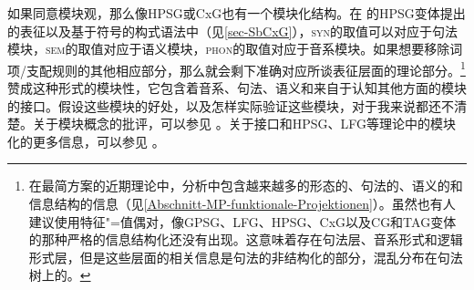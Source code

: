\noindent
如果同意模块观，那么像HPSG或CxG也有一个模块化结构。在 \citet{ps}的HPSG变体提出的表征以及基于符号的构式语法中（见\ref{sec-SbCxG}），\textsc{syn}的取值可以对应于句法模块，\textsc{sem}的取值对应于语义模块，\textsc{phon}的取值对应于音系模块。如果想要移除词项/支配规则的其他相应部分，那么就会剩下准确对应所谈表征层面的理论部分。\footnote{%
在最简方案的近期理论中，分析中包含越来越多的形态的、句法的、语义的和信息结构的信息（见\ref{Abschnitt-MP-funktionale-Projektionen}）。虽然也有人建议使用特征"=值偶对\citep[--291]{SE2002a}，像GPSG\indexgpsgc、LFG\indexlfgc、HPSG\indexhpsgc、CxG\indexcxgc 以及CG\indexcgc 和TAG\indextagc 变体的那种严格的信息结构化还没有出现。这意味着存在句法层、音系形式和逻辑形式层，但是这些层面的相关信息是句法的非结构化的部分，混乱分布在句法树上的。  
} 赞成这种形式的模块性，它包含着音系、句法、语义和来自于认知其他方面的模块的接口。假设这些模块的好处，以及怎样实际验证这些模块，对于我来说都还不清楚。关于模块概念的批评，可以参见 。关于接口和HPSG\indexhpsgc、LFG\indexlfgc 等理论中的模块化的更多信息，可以参见 。

